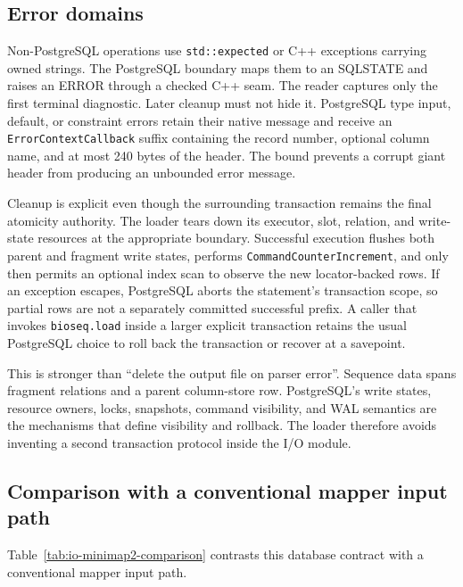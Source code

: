 \subsection{Error domains}

Non-PostgreSQL operations use \texttt{std::expected} or C++ exceptions carrying
owned strings.  The PostgreSQL boundary maps them to an SQLSTATE and raises an
ERROR through a checked C++ seam.  The reader captures only the first terminal
diagnostic. Later cleanup must not hide it. PostgreSQL type input, default, or
constraint errors retain their native message and receive an
\texttt{ErrorContextCallback} suffix containing the record number, optional
column name, and at most 240 bytes of the header.  The bound prevents a corrupt
giant header from producing an unbounded error message.

Cleanup is explicit even though the surrounding transaction remains the final
atomicity authority.  The loader tears down its executor, slot, relation, and
write-state resources at the appropriate boundary. Successful execution
flushes both parent and fragment write states, performs
\texttt{CommandCounterIncrement}, and only then permits an optional index scan
to observe the new locator-backed rows.  If an exception escapes,
PostgreSQL aborts the statement's transaction scope, so partial rows are not a
separately committed successful prefix.  A caller that invokes
\texttt{bioseq.load} inside a larger explicit transaction retains the usual
PostgreSQL choice to roll back the transaction or recover at a savepoint.

This is stronger than ``delete the output file on parser error''. Sequence
data spans fragment relations and a parent column-store row. PostgreSQL's
write states, resource owners, locks, snapshots, command visibility, and WAL
semantics are the mechanisms that define visibility and rollback.  The loader
therefore avoids inventing a second transaction protocol inside the I/O module.

\subsection{Comparison with a conventional mapper input path}

Table~\ref{tab:io-minimap2-comparison} contrasts this database contract with a
conventional mapper input path.

